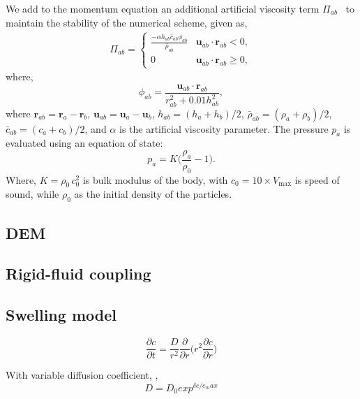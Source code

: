 \documentclass[preprint,12pt]{elsarticle}
\newcommand{\ten}[1]{\ensuremath{\mathbf{#1}}}
\begin{document}
We add to the momentum equation an additional artificial viscosity term
$\Pi_{ab}$~\cite{monaghan-review:2005} to maintain the stability of the
numerical scheme, given as,
\begin{align}
  \label{eq:mom-av}
  \Pi_{ab} =
  \begin{cases}
\frac{-\alpha h_{ab} \bar{c}_{ab} \phi_{ab}}{\bar{\rho}_{ab}}
  & \ten{u}_{ab}\cdot \ten{r}_{ab} < 0, \\
  0 & \ten{u}_{ab}\cdot \ten{r}_{ab} \ge 0,
\end{cases}
\end{align}
where,
%
\begin{equation}
  \label{eq:av-phiij}
  \phi_{ab} = \frac{\ten{u}_{ab} \cdot \ten{r}_{ab}}{r^2_{ab} + 0.01 h^2_{ab}},
\end{equation}
%
where $\ten{r}_{ab} = \ten{r}_a - \ten{r}_b$,
$\ten{u}_{ab} = \ten{u}_a - \ten{u}_b$, $h_{ab} = (h_a + h_b)/2$,
$\bar{\rho}_{ab} = (\rho_a + \rho_b)/2$, $\bar{c}_{ab} = (c_a + c_b) / 2$, and
$\alpha$ is the artificial viscosity parameter.  The pressure $p_a$ is evaluated
using an equation of state:
\begin{equation}
\label{eqn:sph-eos}
  p_a = K \bigg(\frac{\rho_a}{\rho_{0}} - 1 \bigg).
\end{equation}
Where, $K=\rho_0 \, c_0^2$ is bulk modulus of the body, with
$c_0=10 \times V_{\text{max}}$ is speed of sound, while $\rho_0$ as the
initial density of the particles.

\subsection*{DEM}

\subsection*{Rigid-fluid coupling}

\subsection*{Swelling model}

\begin{equation}
\label{eqn:young_swelling_change}
\frac{\partial c}{\partial t} = \frac{D}{r^2}\frac{\partial}{\partial r}\bigg(r^2 \frac{\partial c}{\partial r}\bigg)
\end{equation}

With variable diffusion coefficient, \cite{dutta2020numerical},
\begin{equation}
\label{eqn:shear_swelling_change}
  D = D_0 exp^{\delta c / c_max}
\end{equation}
\end{document}
